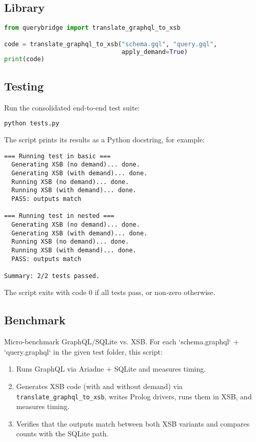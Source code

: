 \documentclass[11pt]{article}
\begin{document}
\subsection{Library}
\begin{lstlisting}[language=Python]
from querybridge import translate_graphql_to_xsb

code = translate_graphql_to_xsb("schema.gql", "query.gql",
                                apply_demand=True)
print(code)
\end{lstlisting}

\subsection{Testing}

Run the consolidated end‐to‐end test suite:

\begin{lstlisting}[language=bash]
python tests.py
\end{lstlisting}

The script prints its results as a Python docstring, for example:

\begin{lstlisting}
=== Running test in basic ===
  Generating XSB (no demand)... done.
  Generating XSB (with demand)... done.
  Running XSB (no demand)... done.
  Running XSB (with demand)... done.
  PASS: outputs match

=== Running test in nested ===
  Generating XSB (no demand)... done.
  Generating XSB (with demand)... done.
  Running XSB (no demand)... done.
  Running XSB (with demand)... done.
  PASS: outputs match

Summary: 2/2 tests passed.
\end{lstlisting}

The script exits with code 0 if all tests pass, or non‐zero otherwise.




\subsection{Benchmark}
Micro-benchmark GraphQL/SQLite vs. XSB. For each `schema.graphql` + `query.graphql` in the given test folder, this script:

\begin{enumerate}
  \item Runs GraphQL via Ariadne + SQLite and measures timing.
  \item Generates XSB code (with and without demand) via \texttt{translate\_graphql\_to\_xsb}, writes Prolog drivers, runs them in XSB, and measures timing.
  \item Verifies that the outputs match between both XSB variants and compares counts with the SQLite path.
\end{enumerate}
\end{document}
